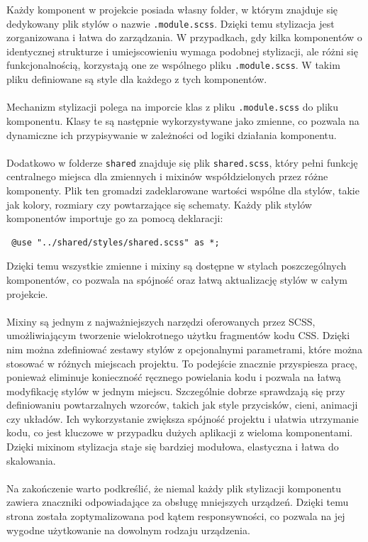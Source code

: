 \documentclass[twoside]{projektInzynierskiMS1}
\begin{document}
\noindent
Każdy komponent w projekcie posiada własny folder, w którym znajduje się dedykowany plik stylów o nazwie \texttt{.module.scss}. Dzięki temu stylizacja jest zorganizowana i łatwa do zarządzania. W przypadkach, gdy kilka komponentów o identycznej strukturze i umiejscowieniu wymaga podobnej stylizacji, ale różni się funkcjonalnością, korzystają one ze wspólnego pliku \texttt{.module.scss}. W takim pliku definiowane są style dla każdego z tych komponentów.
\\\\
Mechanizm stylizacji polega na imporcie klas z pliku \texttt{.module.scss} do pliku komponentu. Klasy te są następnie wykorzystywane jako zmienne, co pozwala na dynamiczne ich przypisywanie w zależności od logiki działania komponentu.
\\\\
Dodatkowo w folderze \texttt{shared} znajduje się plik \texttt{shared.scss}, który pełni funkcję centralnego miejsca dla zmiennych i mixinów współdzielonych przez różne komponenty. Plik ten gromadzi zadeklarowane wartości wspólne dla stylów, takie jak kolory, rozmiary czy powtarzające się schematy. Każdy plik stylów komponentów importuje go za pomocą deklaracji:

\begin{verbatim} @use "../shared/styles/shared.scss" as *; \end{verbatim}

\noindent
Dzięki temu wszystkie zmienne i mixiny są dostępne w stylach poszczególnych komponentów, co pozwala na spójność oraz łatwą aktualizację stylów w całym projekcie.
\\\\
Mixiny są jednym z najważniejszych narzędzi oferowanych przez SCSS, umożliwiającym tworzenie wielokrotnego użytku fragmentów kodu CSS. Dzięki nim można zdefiniować zestawy stylów z opcjonalnymi parametrami, które można stosować w różnych miejscach projektu. To podejście znacznie przyspiesza pracę, ponieważ eliminuje konieczność ręcznego powielania kodu i pozwala na łatwą modyfikację stylów w jednym miejscu. Szczególnie dobrze sprawdzają się przy definiowaniu powtarzalnych wzorców, takich jak style przycisków, cieni, animacji czy układów. Ich wykorzystanie zwiększa spójność projektu i ułatwia utrzymanie kodu, co jest kluczowe w przypadku dużych aplikacji z wieloma komponentami. Dzięki mixinom stylizacja staje się bardziej modułowa, elastyczna i łatwa do skalowania.
\\\\
Na zakończenie warto podkreślić, że niemal każdy plik stylizacji komponentu zawiera znaczniki odpowiadające za obsługę mniejszych urządzeń. Dzięki temu strona została zoptymalizowana pod kątem responsywności, co pozwala na jej wygodne użytkowanie na dowolnym rodzaju urządzenia.
\end{document}
